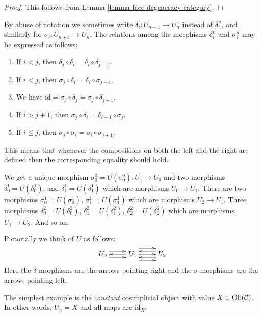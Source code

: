 \begin{proof}
This follows from Lemma \ref{lemma-face-degeneracy-category}.
\end{proof}

\begin{remark}
\label{remark-relations-cosimplicial}
By abuse of notation we sometimes write $\delta_i : U_{n - 1} \to U_n$
instead of $\delta^n_i$, and similarly for $\sigma_i : U_{n + 1} \to U_n$.
The relations among the morphisms $\delta^n_i$ and $\sigma^n_i$
may be expressed as follows:
\begin{enumerate}
\item If $i < j$, then
$\delta_j \circ \delta_i = \delta_i \circ \delta_{j - 1}$.
\item If $i < j$, then
$\sigma_j \circ \delta_i = \delta_i \circ \sigma_{j - 1}$.
\item We have
$\text{id} = \sigma_j \circ \delta_j = \sigma_j \circ \delta_{j + 1}$.
\item If $i > j + 1$, then
$\sigma_j \circ \delta_i = \delta_{i - 1} \circ \sigma_j$.
\item If $i \leq j$, then
$\sigma_j \circ \sigma_i = \sigma_i \circ \sigma_{j + 1}$.
\end{enumerate}
This means that whenever the compositions on both the left and the
right are defined then the corresponding equality should hold.
\end{remark}

\noindent
We get a unique morphism $\sigma^0_0 = U(\sigma^0_0) : U_1 \to U_0$ and
two morphisms $\delta^1_0 = U(\delta^1_0)$, and
$\delta^1_1 = U(\delta^1_1)$ which are morphisms $U_0 \to U_1$.
There are two morphisms
$\sigma^1_0 = U(\sigma^1_0)$, $\sigma^1_1 = U(\sigma^1_1)$
which are morphisms $U_2 \to U_1$. Three morphisms
$\delta^2_0 = U(\delta^2_0)$, $\delta^2_1 = U(\delta^2_1)$,
$\delta^2_2 = U(\delta^2_2)$
which are morphisms $U_1 \to U_2$. And so on.

\medskip\noindent
Pictorially we think of $U$ as follows:
$$
\xymatrix{
U_0
\ar@<1ex>[r]
\ar@<-1ex>[r]
&
U_1
\ar@<0ex>[l]
\ar@<2ex>[r]
\ar@<0ex>[r]
\ar@<-2ex>[r]
&
U_2
\ar@<1ex>[l]
\ar@<-1ex>[l]
}
$$
Here the $\delta$-morphisms are the arrows pointing right and the
$\sigma$-morphisms are the arrows pointing left.

\begin{example}
\label{example-constant-cosimplicial-object}
The simplest example is the {\it constant} cosimplicial object with
value $X \in \mathop{\mathrm{Ob}}\nolimits(\mathcal{C})$. In other words, $U_n = X$ and
all maps are $\text{id}_X$.
\end{example}

